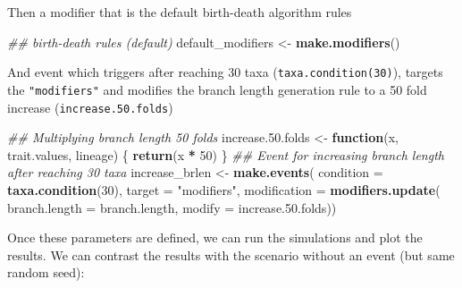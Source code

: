 \documentclass[
]{book}
\newenvironment{Shaded}{\begin{snugshade}}{\end{snugshade}}
\newcommand{\CommentTok}[1]{\textcolor[rgb]{0.56,0.35,0.01}{\textit{#1}}}
\newcommand{\ControlFlowTok}[1]{\textcolor[rgb]{0.13,0.29,0.53}{\textbf{#1}}}
\newcommand{\DataTypeTok}[1]{\textcolor[rgb]{0.13,0.29,0.53}{#1}}
\newcommand{\DecValTok}[1]{\textcolor[rgb]{0.00,0.00,0.81}{#1}}
\newcommand{\FloatTok}[1]{\textcolor[rgb]{0.00,0.00,0.81}{#1}}
\newcommand{\KeywordTok}[1]{\textcolor[rgb]{0.13,0.29,0.53}{\textbf{#1}}}
\newcommand{\NormalTok}[1]{#1}
\newcommand{\OperatorTok}[1]{\textcolor[rgb]{0.81,0.36,0.00}{\textbf{#1}}}
\newcommand{\StringTok}[1]{\textcolor[rgb]{0.31,0.60,0.02}{#1}}
\begin{document}
Then a modifier that is the default birth-death algorithm rules

\begin{Shaded}
\begin{Highlighting}[]
\CommentTok{\#\# birth{-}death rules (default)}
\NormalTok{default\_modifiers \textless{}{-}}\StringTok{ }\KeywordTok{make.modifiers}\NormalTok{()}
\end{Highlighting}
\end{Shaded}

And event which triggers after reaching 30 taxa (\texttt{taxa.condition(30)}), targets the \texttt{"modifiers"} and modifies the branch length generation rule to a 50 fold increase (\texttt{increase.50.folds})

\begin{Shaded}
\begin{Highlighting}[]
\CommentTok{\#\# Multiplying branch length 50 folds}
\NormalTok{increase.}\FloatTok{50.}\NormalTok{folds \textless{}{-}}\StringTok{ }\ControlFlowTok{function}\NormalTok{(x, trait.values, lineage) \{}
  \KeywordTok{return}\NormalTok{(x }\OperatorTok{*}\StringTok{ }\DecValTok{50}\NormalTok{)}
\NormalTok{\}}
\CommentTok{\#\# Event for increasing branch length after reaching 30 taxa}
\NormalTok{increase\_brlen \textless{}{-}}\StringTok{ }\KeywordTok{make.events}\NormalTok{(}
                  \DataTypeTok{condition =} \KeywordTok{taxa.condition}\NormalTok{(}\DecValTok{30}\NormalTok{),}
                  \DataTypeTok{target =} \StringTok{"modifiers"}\NormalTok{,}
                  \DataTypeTok{modification =} \KeywordTok{modifiers.update}\NormalTok{(}
                                    \DataTypeTok{branch.length =}\NormalTok{ branch.length,}
                                    \DataTypeTok{modify  =}\NormalTok{ increase.}\FloatTok{50.}\NormalTok{folds))}
\end{Highlighting}
\end{Shaded}

Once these parameters are defined, we can run the simulations and plot the results.
We can contrast the results with the scenario without an event (but same random seed):
\end{document}
